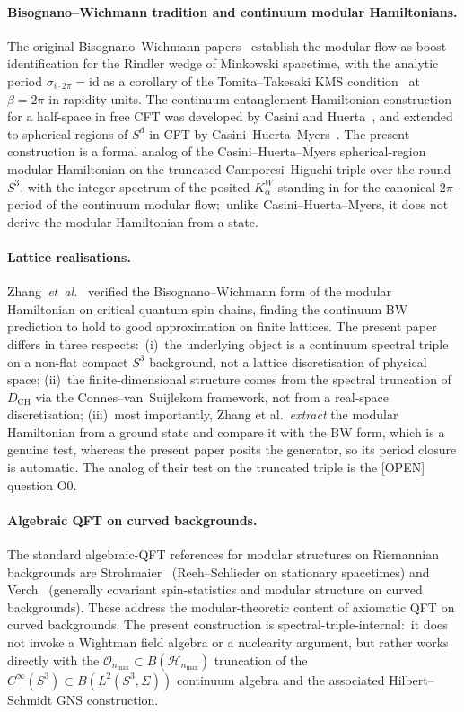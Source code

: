 \documentclass[11pt,a4paper]{article}
\theoremstyle{plain}
\theoremstyle{definition}
\newcommand{\nmax}{n_{\max}}
\newcommand{\sthree}{S^{3}}
\newcommand{\Hilb}{\mathcal{H}}
\newcommand{\Op}{\mathcal{O}}
\newcommand{\DCH}{D_{\mathrm{CH}}}
\begin{document}
\paragraph{Bisognano--Wichmann tradition and continuum modular
Hamiltonians.}
The original Bisognano--Wichmann
papers~\cite{bisognano_wichmann1975, bisognano_wichmann1976} establish
the modular-flow-as-boost identification for the Rindler wedge of
Minkowski spacetime, with the analytic period $\sigma_{i \cdot 2\pi} =
\mathrm{id}$ as a corollary of the Tomita--Takesaki KMS
condition~\cite{takesaki1970, tomita1967} at $\beta = 2\pi$ in
rapidity units. The continuum entanglement-Hamiltonian construction
for a half-space in free CFT was developed by Casini and
Huerta~\cite{casini_huerta2009}, and extended to spherical regions of
$S^d$ in CFT by Casini--Huerta--Myers~\cite{casini_huerta_myers2011}.
The present construction is a formal analog of the
Casini--Huerta--Myers spherical-region modular Hamiltonian on the
truncated Camporesi--Higuchi triple over the round $\sthree$, with
the integer spectrum of the posited $K_\alpha^W$ standing in for the
canonical $2\pi$-period of the continuum modular flow;\ unlike
Casini--Huerta--Myers, it does not derive the modular Hamiltonian from
a state.

\paragraph{Lattice realisations.}
Zhang~\emph{et~al.}~\cite{zhu_casini2020} verified the
Bisognano--Wichmann form of the modular Hamiltonian on critical
quantum spin chains, finding the continuum BW prediction to hold to
good approximation on finite lattices. The present paper differs in
three respects:\ (i)~the underlying object is a continuum spectral
triple on a non-flat compact $\sthree$ background, not a lattice
discretisation of physical space; (ii)~the finite-dimensional
structure comes from the spectral truncation of $\DCH$ via the
Connes--van~Suijlekom framework, not from a real-space discretisation;
(iii)~most importantly, Zhang et al.\ \emph{extract} the modular
Hamiltonian from a ground state and compare it with the BW form,
which is a genuine test, whereas the present paper posits the
generator, so its period closure is automatic.  The analog of their
test on the truncated triple is the [OPEN] question O0.

\paragraph{Algebraic QFT on curved backgrounds.}
The standard algebraic-QFT references for modular structures on
Riemannian backgrounds are
Strohmaier~\cite{strohmaier2006} (Reeh--Schlieder on stationary
spacetimes) and Verch~\cite{verch2001} (generally covariant
spin-statistics and modular structure on curved
backgrounds). These address the modular-theoretic content
of axiomatic QFT on curved backgrounds. The present construction is
spectral-triple-internal:\ it does not invoke a Wightman field algebra
or a nuclearity argument, but rather works directly with the
$\Op_{\nmax} \subset B(\Hilb_{\nmax})$ truncation of the
$C^\infty(\sthree) \subset B(L^2(\sthree, \Sigma))$ continuum algebra
and the associated Hilbert--Schmidt GNS construction.
\end{document}
